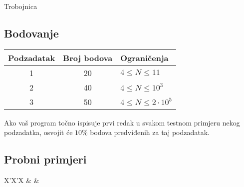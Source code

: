 \begin{statement}[
  problempoints=110,
  timelimit=1 sekunda,
  memorylimit=512 MiB,
]{Trobojnica}
\subsection*{Bodovanje}
{\renewcommand{\arraystretch}{1.4}
  \setlength{\tabcolsep}{6pt}
  \begin{tabular}{ccl}
 Podzadatak & Broj bodova & Ograničenja \\ \midrule
  1 & 20 & $4 \le N \le 11$ \\
  2 & 40 & $4 \le N \le 10^3$ \\
  3 & 50 & $4 \le N \le 2\cdot10^5$ \\
\end{tabular}}

Ako vaš program točno ispisuje prvi redak u svakom testnom primjeru nekog
podzadatka, osvojit će $10\%$ bodova predviđenih za taj podzadatak.

\subsection*{Probni primjeri}
\begin{tabularx}{\textwidth}{X'X'X}
 &
 &
\end{tabularx}




\end{statement}

